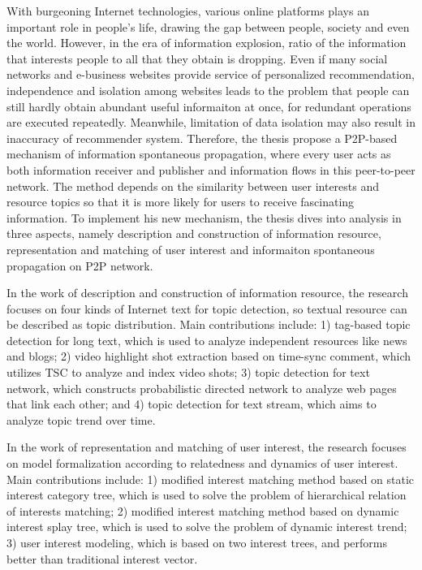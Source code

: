 \begin{eabstract}
With burgeoning Internet technologies, various online platforms plays an important role in people's life, drawing the gap between people, society and even the world. However, in the era of information explosion, ratio of the information that interests people to all that they obtain is dropping. Even if many social networks and e-business websites provide service of personalized recommendation, independence and isolation among websites leads to the problem that people can still hardly obtain abundant useful informaiton at once, for redundant operations are executed repeatedly. Meanwhile, limitation of data isolation may also result in inaccuracy of recommender system. Therefore, the thesis propose a P2P-based mechanism of information spontaneous propagation, where every user acts as both information receiver and publisher and information flows in this peer-to-peer network. The method depends on the similarity between user interests and resource topics so that it is more likely for users to receive fascinating information. To implement his new mechanism, the thesis dives into analysis in three aspects, namely description and construction of information resource, representation and matching of user interest and informaiton spontaneous propagation on P2P network.

In the work of description and construction of information resource, the research focuses on four kinds of Internet text for topic detection, so textual resource can be described as topic distribution. Main contributions include: 1) tag-based topic detection for long text, which is used to analyze independent resources like news and blogs; 2) video highlight shot extraction based on time-sync comment, which utilizes TSC to analyze and index video shots; 3) topic detection for text network, which constructs probabilistic directed network to analyze web pages that link each other; and 4) topic detection for text stream, which aims to analyze topic trend over time.

In the work of representation and matching of user interest, the research focuses on model formalization according to relatedness and dynamics of user interest. Main contributions include: 1) modified interest matching method based on static interest category tree, which is used to solve the problem of hierarchical relation of interests matching; 2) modified interest matching method based on dynamic interest splay tree, which is used to solve the problem of dynamic interest trend; 3) user interest modeling, which is based on two interest trees, and performs better than traditional interest vector.


\end{eabstract}
